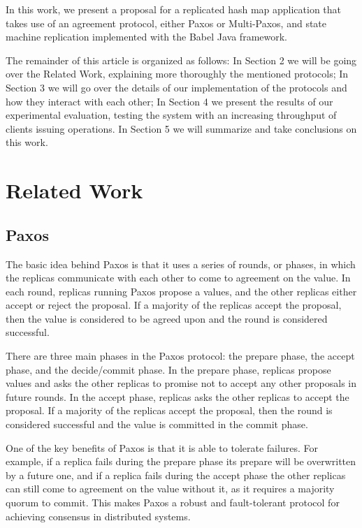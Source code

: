 \documentclass[sigconf]{acmart}
\begin{document}
In this work, we present a proposal for a replicated hash map application that takes use of an agreement protocol, either Paxos or Multi-Paxos, and state machine replication implemented with the Babel \cite{fouto2022babel} Java framework.

The remainder of this article is organized as follows: In Section 2 we will be going over the Related Work, explaining more thoroughly the mentioned protocols; In Section 3 we will go over the details of our implementation of the protocols and how they interact with each other; In Section 4 we present the results of our experimental evaluation, testing the system with an increasing throughput of clients issuing operations. In Section 5 we will summarize and take conclusions on this work.


\section{Related Work}

\subsection{Paxos} 

The basic idea behind Paxos is that it uses a series of rounds, or phases, in which the replicas communicate with each other to come to agreement on the value. In each round, replicas running Paxos propose a values, and the other replicas either accept or reject the proposal. If a majority of the replicas accept the proposal, then the value is considered to be agreed upon and the round is considered successful.

There are three main phases in the Paxos protocol: the prepare phase, the accept phase, and the decide/commit phase. In the prepare phase, replicas propose values and asks the other replicas to promise not to accept any other proposals in future rounds. In the accept phase, replicas asks the other replicas to accept the proposal. If a majority of the replicas accept the proposal, then the round is considered successful and the value is committed in the commit phase.

One of the key benefits of Paxos is that it is able to tolerate failures. For example, if a replica fails during the prepare phase its prepare will be overwritten by a future one, and if a replica fails during the accept phase the other replicas can still come to agreement on the value without it, as it requires a majority quorum to commit. This makes Paxos a robust and fault-tolerant protocol for achieving consensus in distributed systems.
\end{document}
